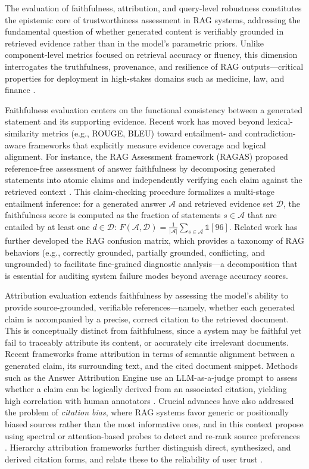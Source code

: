 \documentclass[11pt,a4paper]{article}
\begin{document}
The evaluation of faithfulness, attribution, and query-level robustness constitutes the epistemic core of trustworthiness assessment in RAG systems, addressing the fundamental question of whether generated content is verifiably grounded in retrieved evidence rather than in the model's parametric priors. Unlike component-level metrics focused on retrieval accuracy or fluency, this dimension interrogates the truthfulness, provenance, and resilience of RAG outputs---critical properties for deployment in high-stakes domains such as medicine, law, and finance \cite{arxiv:2404.10981v1}.

Faithfulness evaluation centers on the functional consistency between a generated statement and its supporting evidence. Recent work has moved beyond lexical-similarity metrics (e.g., ROUGE, BLEU) toward entailment- and contradiction-aware frameworks that explicitly measure evidence coverage and logical alignment. For instance, the RAG Assessment framework (RAGAS) proposed reference-free assessment of answer faithfulness by decomposing generated statements into atomic claims and independently verifying each claim against the retrieved context \cite{arxiv:2309.15217v1}. This claim-checking procedure formalizes a multi-stage entailment inference: for a generated answer \( \mathcal{A} \) and retrieved evidence set \( \mathcal{D} \), the faithfulness score is computed as the fraction of statements \( s \in \mathcal{A} \) that are entailed by at least one \( d \in \mathcal{D} \): \( F(\mathcal{A}, \mathcal{D}) = \frac{1}{|\mathcal{A}|} \sum_{s \in \mathcal{A}} \mathbb{1}[96] \). Related work has further developed the RAG confusion matrix, which provides a taxonomy of RAG behaviors (e.g., correctly grounded, partially grounded, conflicting, and ungrounded) to facilitate fine-grained diagnostic analysis---a decomposition that is essential for auditing system failure modes beyond average accuracy scores.

Attribution evaluation extends faithfulness by assessing the model's ability to provide source-grounded, verifiable references---namely, whether each generated claim is accompanied by a precise, correct citation to the retrieved document. This is conceptually distinct from faithfulness, since a system may be faithful yet fail to traceably attribute its content, or accurately cite irrelevant documents. Recent frameworks frame attribution in terms of semantic alignment between a generated claim, its surrounding text, and the cited document snippet. Methods such as the Answer Attribution Engine use an LLM-as-a-judge prompt to assess whether a claim can be logically derived from an associated citation, yielding high correlation with human annotators \cite{arxiv:2312.10997v5}. Crucial advances have also addressed the problem of \emph{citation bias}, where RAG systems favor generic or positionally biased sources rather than the most informative ones, and in this context propose using spectral or attention-based probes to detect and re-rank source preferences \cite{arxiv:2506.00054v1}. Hierarchy attribution frameworks further distinguish direct, synthesized, and derived citation forms, and relate these to the reliability of user trust \cite{arxiv:2503.18016v1}.
\end{document}
